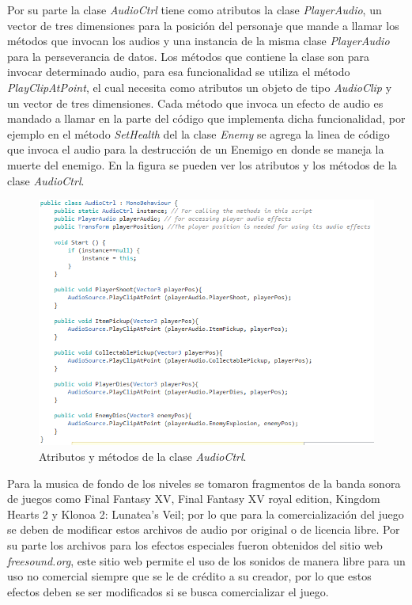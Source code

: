 Por su parte la clase \textit{AudioCtrl} tiene como atributos la clase 
\textit{PlayerAudio}, un vector de tres dimensiones para la posición del 
personaje que mande a llamar los métodos que invocan los audios y una instancia 
de la misma clase \textit{PlayerAudio} para la perseverancia de datos. Los 
métodos que contiene la clase son para invocar determinado audio, para esa 
funcionalidad se utiliza el método \textit{PlayClipAtPoint}, el cual necesita 
como atributos un objeto de tipo \textit{AudioClip} y un vector de tres 
dimensiones. Cada método que invoca un efecto de audio es mandado a llamar en la 
parte del código que implementa dicha funcionalidad, por ejemplo en el método 
\textit{SetHealth} del la clase \textit{Enemy} se agrega la linea de código que 
invoca el audio para la destrucción de un Enemigo en donde se maneja la muerte 
del enemigo. En la figura se pueden ver los atributos y los métodos de la clase 
\textit{AudioCtrl}.  

	\begin{figure}[h]
		\centering
		\includegraphics[height=0.3 \textheight]{03TrabajoRealizado/imagenes/audioCtrl.png}
		\caption{Atributos y métodos de la clase \textit{AudioCtrl}.}
		\label{fig:AudioCrl}
	\end{figure}
Para la musica de fondo de los niveles se tomaron fragmentos de la banda sonora 
de juegos como Final Fantasy XV, Final Fantasy XV royal edition, Kingdom Hearts 2 
y Klonoa 2: Lunatea's Veil; por lo que para la comercialización del juego se deben 
de modificar estos archivos de audio por original o de licencia libre. Por su 
parte los archivos para los efectos especiales fueron obtenidos del sitio web 
\textit{freesound.org}, este sitio web permite el uso de los sonidos de manera 
libre para un uso no comercial siempre que se le de crédito a su creador, por lo 
que estos efectos deben se ser modificados si se busca comercializar el juego. 
